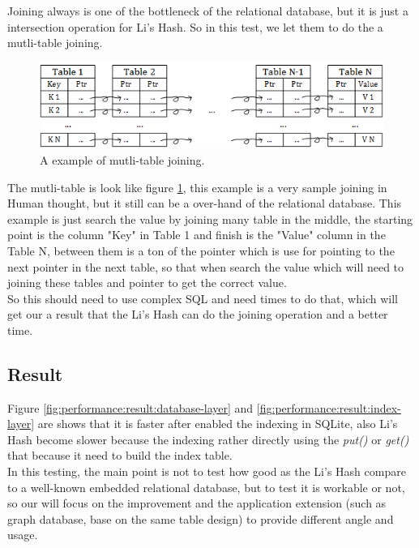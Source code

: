 \begin{enumerate}
Joining always is one of the bottleneck of the relational database, but it is just a intersection operation for Li's Hash. So in this test, we let them to do the a mutli-table joining.\\

\begin{figure}[h]
\centering
\includegraphics[scale=0.8]{./performance/pic/multi-table_v1.png}
\caption{A example of mutli-table joining.}
\label{fig:performance:multi-table}
\end{figure}

The mutli-table is look like figure \ref{fig:performance:multi-table}, this example is a very sample joining in Human thought, but it still can be a over-hand of the relational database. This example is just search the value by joining many table in the middle, the starting point is the column "Key" in Table 1 and finish is the "Value" column in the Table N, between them is a ton of the pointer which is use for pointing to the next pointer in the next table, so that when search the value which will need to joining these tables and pointer to get the correct value.\\

So this should need to use complex SQL and need times to do that, which will get our a result that the Li's Hash can do the  joining operation and a better time.\\

\clearpage


\end{enumerate}

\subsection{Result}

Figure \ref{fig:performance:result:database-layer} and \ref{fig:performance:result:index-layer} are shows that it is faster after enabled the indexing in SQLite, also Li's Hash become slower because the indexing rather directly using the \textit{put()} or \textit{get()} that because it need to build the index table.\\

In this testing, the main point is not to test how good as the Li's Hash compare to a well-known embedded relational database, but to test it is workable or not, so our will focus on the improvement and the application extension (such as graph database, base on the same table design) to provide different angle and usage.\\

\clearpage

